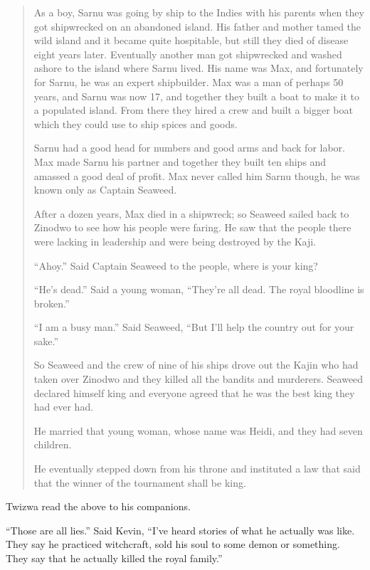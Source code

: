 \begin{quote}

As a boy, Sarnu was going by ship to the Indies with his parents when they got shipwrecked on an abandoned island.
His father and mother tamed the wild island and it became quite hospitable, but still they died of disease eight years later.
Eventually another man got shipwrecked and washed ashore to the island where Sarnu lived.
His name was Max, and fortunately for Sarnu, he was an expert shipbuilder.
Max was a man of perhaps 50 years, and Sarnu was now 17, and together they built a boat to make it to a populated island.
From there they hired a crew and built a bigger boat which they could use to ship spices and goods.

Sarnu had a good head for numbers and good arms and back for labor.
Max made Sarnu his partner and together they built ten ships and amassed a good deal of profit.
Max never called him Sarnu though, he was known only as Captain Seaweed.

After a dozen years, Max died in a shipwreck; so Seaweed sailed back to Zi\-no\-dwo to see how his people were faring.
He saw that the people there were lacking in leadership and were being destroyed by the Ka\-ji.

``Ahoy.'' Said Captain Seaweed to the people, where is your king?

``He's dead.'' Said a young woman, ``They're all dead. The royal bloodline is broken.''

``I am a busy man.'' Said Seaweed, ``But I'll help the country out for your sake.''

So Seaweed and the crew of nine of his ships drove out the Ka\-jin who had taken over Zi\-no\-dwo and they killed all the bandits and murderers. Seaweed declared himself king and everyone agreed that he was the best king they had ever had.

He married that young woman, whose name was Heidi, and they had seven children.

He eventually stepped down from his throne and instituted a law that said that the winner of the tournament shall be king.

\end{quote}

Twi\-zwa read the above to his companions.

``Those are all lies.'' Said Kevin, ``I've heard stories of what he actually was like. They say he practiced witchcraft, sold his soul to some demon or something. They say that he actually killed the royal family.''


